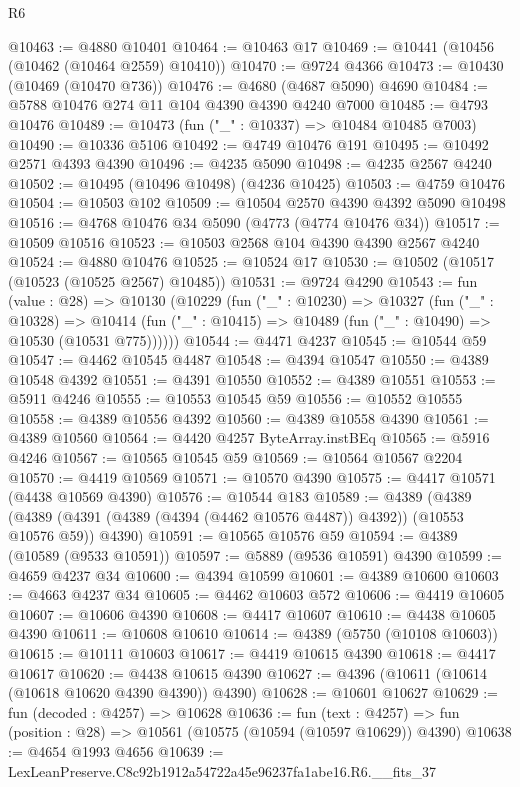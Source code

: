 \begin{lexlean}{R6}
\begin{coremodule}
@10463 := @4880 @10401
@10464 := @10463 @17
@10469 := @10441 (@10456 (@10462 (@10464 @2559) @10410))
@10470 := @9724 @4366
@10473 := @10430 (@10469 (@10470 @736))
@10476 := @4680 (@4687 @5090) @4690
@10484 := @5788 @10476 @274 @11 @104 @4390 @4390 @4240 @7000
@10485 := @4793 @10476
@10489 := @10473 (fun ("_" : @10337) => @10484 @10485 @7003)
@10490 := @10336 @5106
@10492 := @4749 @10476 @191
@10495 := @10492 @2571 @4393 @4390
@10496 := @4235 @5090
@10498 := @4235 @2567 @4240
@10502 := @10495 (@10496 @10498) (@4236 @10425)
@10503 := @4759 @10476
@10504 := @10503 @102
@10509 := @10504 @2570 @4390 @4392 @5090 @10498
@10516 := @4768 @10476 @34 @5090 (@4773 (@4774 @10476 @34))
@10517 := @10509 @10516
@10523 := @10503 @2568 @104 @4390 @4390 @2567 @4240
@10524 := @4880 @10476
@10525 := @10524 @17
@10530 := @10502 (@10517 (@10523 (@10525 @2567) @10485))
@10531 := @9724 @4290
@10543 := fun (value : @28) =>
  @10130
    (@10229
      (fun ("_" : @10230) =>
      @10327
        (fun ("_" : @10328) =>
        @10414 (fun ("_" : @10415) => @10489 (fun ("_" : @10490) => @10530 (@10531 @775))))))
@10544 := @4471 @4237
@10545 := @10544 @59
@10547 := @4462 @10545 @4487
@10548 := @4394 @10547
@10550 := @4389 @10548 @4392
@10551 := @4391 @10550
@10552 := @4389 @10551
@10553 := @5911 @4246
@10555 := @10553 @10545 @59
@10556 := @10552 @10555
@10558 := @4389 @10556 @4392
@10560 := @4389 @10558 @4390
@10561 := @4389 @10560
@10564 := @4420 @4257 ByteArray.instBEq
@10565 := @5916 @4246
@10567 := @10565 @10545 @59
@10569 := @10564 @10567 @2204
@10570 := @4419 @10569
@10571 := @10570 @4390
@10575 := @4417 @10571 (@4438 @10569 @4390)
@10576 := @10544 @183
@10589 := @4389
    (@4389 (@4389 (@4391 (@4389 (@4394 (@4462 @10576 @4487)) @4392)) (@10553 @10576 @59)) @4390)
@10591 := @10565 @10576 @59
@10594 := @4389 (@10589 (@9533 @10591))
@10597 := @5889 (@9536 @10591) @4390
@10599 := @4659 @4237 @34
@10600 := @4394 @10599
@10601 := @4389 @10600
@10603 := @4663 @4237 @34
@10605 := @4462 @10603 @572
@10606 := @4419 @10605
@10607 := @10606 @4390
@10608 := @4417 @10607
@10610 := @4438 @10605 @4390
@10611 := @10608 @10610
@10614 := @4389 (@5750 (@10108 @10603))
@10615 := @10111 @10603
@10617 := @4419 @10615 @4390
@10618 := @4417 @10617
@10620 := @4438 @10615 @4390
@10627 := @4396 (@10611 (@10614 (@10618 @10620 @4390 @4390)) @4390)
@10628 := @10601 @10627
@10629 := fun (decoded : @4257) => @10628
@10636 := fun (text : @4257) =>
  fun (position : @28) => @10561 (@10575 (@10594 (@10597 @10629)) @4390)
@10638 := @4654 @1993 @4656
@10639 := LexLeanPreserve.C8c92b1912a54722a45e96237fa1abe16.R6.__fits_37

\end{coremodule}
\end{lexlean}
